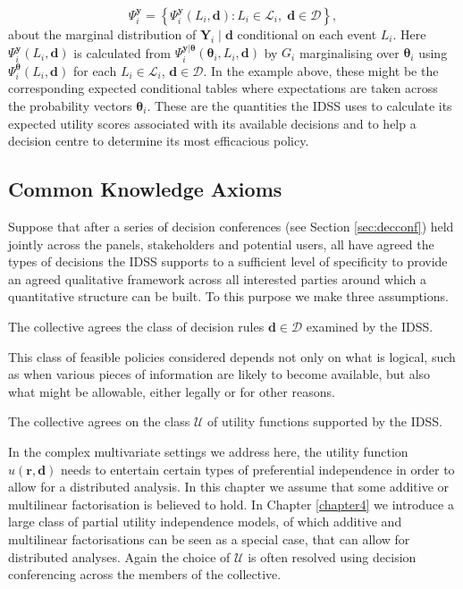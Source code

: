 \begin{enumerate}
\[
\Psi _{i}^{\bm{y}}= \left\{ \Psi _{i}^{\bm{y}}(L_i,\bm{d}):L_i\in\mathcal{L}_i,\; \bm{d}\in \bm{\mathcal{D}}\right\} ,
\]
about the marginal distribution of $\bm{Y}_{i}\;|\;\bm{d}$ conditional on each event $L_{i}$. Here $\Psi _{i}^{\bm{y}}(L_{i},\bm{d})$ is calculated from $\Psi_{i}^{\bm{y}|\bm{\theta }}(\bm{\theta }_{i},L_{i},\bm{d})$ by $G_{i}$ marginalising over $\bm{\theta }_{i}$ using $\Psi _{i}^{\bm{\theta}}(L_{i},\bm{d})$ for each $L_{i}\in \mathcal{L}_{i}$, $\bm{d}\in \bm{\mathcal{D}}$. In the example above, these might be the corresponding expected conditional tables where expectations are taken across the probability vectors $\bm{\theta }_{i}$.  These are the quantities the IDSS uses to calculate its expected utility scores associated with its available decisions and to help a decision centre to determine its most efficacious policy.
\end{enumerate}

\subsection{Common Knowledge Axioms}
Suppose that after a series of decision conferences (see Section \ref{sec:decconf}) held jointly across the panels, stakeholders and potential users, all have agreed the types of decisions the IDSS  supports to a sufficient level of specificity to provide an agreed qualitative framework across all interested parties around which a quantitative structure can be built. To this purpose we make three assumptions.

\begin{axiom}
\label{axiom:policy}
The collective agrees the class of decision rules $\bm{d}\in \bm{\mathcal{D}}$ examined by the IDSS.
\end{axiom}

This class of feasible policies considered  depends not only on what is logical, such as when various pieces of information are likely to become available, but also what might be allowable, either legally or for other reasons.

\begin{axiom}
\label{axiom:utility}
The collective agrees on the class $\mathcal{U}$ of utility functions supported by the IDSS.
\end{axiom}
In the complex multivariate settings we address here, the utility function $u(\bm{r},\bm{d})$ needs to entertain certain types of preferential independence in order to allow for a distributed analysis. In this chapter we assume that some additive or multilinear factorisation is believed to hold. In Chapter \ref{chapter4} we introduce a large class of partial utility independence models, of which additive and multilinear factorisations can be seen as a special case, that can allow for distributed analyses. Again the choice of $\mathcal{U}$ is often resolved using decision conferencing across the members of the collective.

